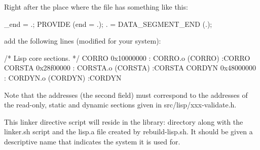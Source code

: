 Right after the place where the file has something like this:

  _end = .;
  PROVIDE (end = .);
  . = DATA_SEGMENT_END (.);

  add the following lines (modified for your system):

  /* Lisp core sections. */
  CORRO  0x10000000 : { CORRO.o  (CORRO)  } :CORRO
  CORSTA 0x28f00000 : { CORSTA.o (CORSTA) } :CORSTA
  CORDYN 0x48000000 : { CORDYN.o (CORDYN) } :CORDYN

Note that the addresses (the second field) must correspond to the addresses of the read-only,
static and dynamic sections given in src/lisp/xxx-validate.h.

This linker directive script will reside in the library: directory along with the linker.sh
script and the lisp.a file created by rebuild-lisp.sh.  It should be given a descriptive name
that indicates the system it is used for.
